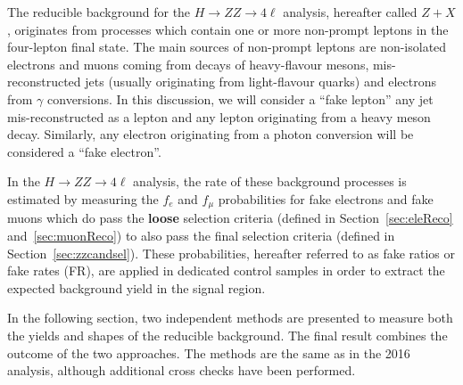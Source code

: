 
The reducible background for the $H\to ZZ\to 4\ell $ analysis, hereafter called $Z+X$, originates from processes which contain one or more non-prompt leptons in the four-lepton final state. 
The main sources of non-prompt leptons are non-isolated electrons and muons coming from decays of heavy-flavour mesons, mis-reconstructed jets (usually originating from light-flavour quarks) and electrons from $\gamma$ conversions. 
In this discussion, we will consider a ``fake lepton'' any jet mis-reconstructed as a lepton and any lepton originating from a heavy meson decay.
Similarly, any electron originating from a photon conversion will be considered a ``fake electron''.

In the $H\to ZZ\to 4\ell $ analysis, the rate of these background processes is estimated by measuring the $f_{e}$ and $f_{\mu}$ probabilities for fake electrons and fake muons which do pass the {\bf loose} selection criteria (defined in Section~\ref{sec:eleReco} and~\ref{sec:muonReco}) to also pass the final selection criteria (defined in Section~\ref{sec:zzcandsel}).  
These probabilities, hereafter referred to as fake ratios or fake rates (FR), are applied in dedicated control samples in order to extract the expected background yield in the signal region. 

In the following section, two independent methods are presented to measure both the yields and shapes of the reducible background. The final result combines the outcome of the two approaches. The methods are the same as in the 2016 analysis, although additional cross checks have been performed. 

